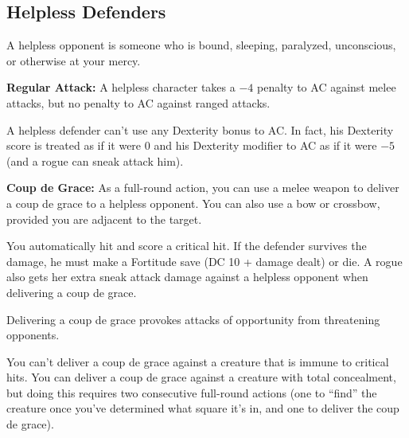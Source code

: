 \subsection{Helpless Defenders}
A helpless opponent is someone who is bound, sleeping, paralyzed, unconscious, or otherwise at your mercy.

\textbf{Regular Attack:} A helpless character takes a $-4$ penalty to AC against melee attacks, but no penalty to AC against ranged attacks.

A helpless defender can't use any Dexterity bonus to AC. In fact, his Dexterity score is treated as if it were 0 and his Dexterity modifier to AC as if it were $-5$ (and a rogue can sneak attack him).

\textbf{Coup de Grace:} As a full-round action, you can use a melee weapon to deliver a coup de grace to a helpless opponent. You can also use a bow or crossbow, provided you are adjacent to the target.

You automatically hit and score a critical hit. If the defender survives the damage, he must make a Fortitude save (DC 10 + damage dealt) or die. A rogue also gets her extra sneak attack damage against a helpless opponent when delivering a coup de grace.

Delivering a coup de grace provokes attacks of opportunity from threatening opponents.

You can't deliver a coup de grace against a creature that is immune to critical hits. You can deliver a coup de grace against a creature with total concealment, but doing this requires two consecutive full-round actions (one to ``find'' the creature once you've determined what square it's in, and one to deliver the coup de grace).
